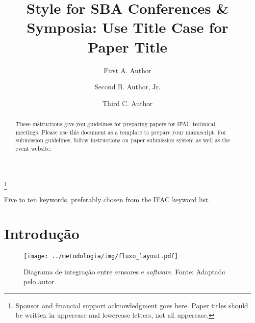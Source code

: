 \documentclass[a4paper]{ifacconf}
\begin{document}
\begin{frontmatter}

\title{Style for SBA Conferences \& Symposia: Use Title Case for
  Paper Title} 

\thanks[footnoteinfo]{Sponsor and financial support acknowledgment
goes here. Paper titles should be written in uppercase and lowercase
letters, not all uppercase.}

\author[First]{First A. Author} 
\author[Second]{Second B. Author, Jr.} 
\author[Third]{Third C. Author}


\address[First]{Faculdade de Engenharia Elétrica, Universidade do Triângulo, MG, (e-mail: autor1@faceg@univt.br).}
\address[Second]{Faculdade de Engenharia de Controle \& Automação, Universidade do Futuro, RJ (e-mail: autor2@feca.unifutu.rj)}
\address[Third]{Electrical Engineering Department, 
   Seoul National University, Seoul, Korea, (e-mail: author3@snu.ac.kr)}
   
\renewcommand{\abstractname}{{\bf Abstract:~}}   
   
\begin{abstract}                %
These instructions give you guidelines for preparing papers for IFAC
technical meetings. Please use this document as a template to prepare
your manuscript. For submission guidelines, follow instructions on
paper submission system as well as the event website.
\end{abstract}

\begin{keyword}
Five to ten keywords, preferably chosen from the IFAC keyword list.
\end{keyword}

\end{frontmatter}
\fi



\section{Introdução}

\begin{figure}[h!]
  \begin{center}
      \texttt{[image: ../metodologia/img/fluxo\_layout.pdf]}
  \end{center}
  \caption{Diagrama de integração  entre sensores e \textit{software}. Fonte: Adaptado pelo autor.}
  \label{fig:fluxo_integracao}
\end{figure}
\end{document}
